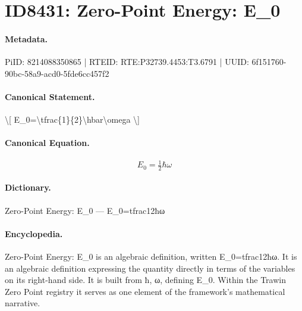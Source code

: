 \section*{ID8431: Zero-Point Energy: E\_0}
\paragraph{Metadata.}
PiID: 8214088350865 | RTEID: RTE:P32739.4453:T3.6791 | UUID: 6f151760-90bc-58a9-acd0-5fde6cc457f2

\paragraph{Canonical Statement.}
\textbackslash{}[ E\_0=\textbackslash{}tfrac\{1\}\{2\}\textbackslash{}hbar\textbackslash{}omega \textbackslash{}]

\paragraph{Canonical Equation.}
\[
E_0=\tfrac{1}{2}\hbar\omega
\]

\paragraph{Dictionary.}
Zero-Point Energy: E\_0 — E\_0=tfrac12ħω

\paragraph{Encyclopedia.}
Zero-Point Energy: E\_0 is an algebraic definition, written E\_0=tfrac12ħω. It is an algebraic definition expressing the quantity directly in terms of the variables on its right-hand side. It is built from ħ, ω, defining E\_0. Within the Trawin Zero Point registry it serves as one element of the framework's mathematical narrative.
